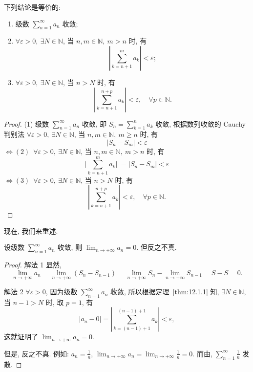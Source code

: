 \begin{theorem}\label{thm:12.1.1}
下列结论是等价的:
\begin{enumerate}
  \item 级数 $\sum_{n=1}^{\infty}a_{n}$ 收敛;
  \item $\forall\varepsilon>0,\ \exists N\in\mathbb{N}$, 当 $n,m\in\mathbb{N},\ m>n$ 时, 有
  \[
    \left|\sum_{k=n+1}^{m}a_{k}\right|<\varepsilon;
\]
  \item $\forall\varepsilon>0,\ \exists N\in\mathbb{N}$, 当 $n>N$ 时, 有
  \[
    \left|\sum_{k=n+1}^{n+p}a_{k}\right|<\varepsilon,\quad \forall p\in\mathbb{N}.
\]
\end{enumerate}
\end{theorem}

\begin{proof}
(1) 级数 $\sum_{n=1}^{\infty}a_{n}$ 收敛, 即 $S_{n}=\sum_{k=1}^{n}a_{k}$ 收敛, 根据数列收敛的 Cauchy 判别法 $\forall\varepsilon>0,\ \exists N\in\mathbb{N}$, 当 $n,m\in\mathbb{N},\ m\geqslant n$ 时, 有
\[
  |S_{n}-S_{m}|<\varepsilon
\]
$\Leftrightarrow(2)$\ $\forall\varepsilon>0,\ \exists N\in\mathbb{N}$, 当 $n,m\in\mathbb{N},\ m>n$ 时, 有
\[
  \Big|\sum_{k=n+1}^{m}a_{k}\Big|\;=|S_{n}-S_{m}|<\varepsilon
\]
$\Leftrightarrow(3)$\ $\forall\varepsilon>0,\ \exists N\in\mathbb{N}$, 当 $n>N$ 时, 有
\[
  \left|\sum_{k=n+1}^{n+p}a_{k}\right|<\varepsilon,\quad \forall p\in\mathbb{N}.
\]
\end{proof}

现在, 我们来重述.

\begin{theorem}[级数收敛的必要条件]\label{thm:12.1.2}
设级数 $\sum_{n=1}^{\infty}a_{n}$ 收敛, 则 $\lim_{n\to+\infty}a_{n}=0$. 但反之不真.
\end{theorem}

\begin{proof}
解法 1 显然,
\[
  \lim_{n\to+\infty}a_{n}=\lim_{n\to+\infty}(S_{n}-S_{n-1})=\lim_{n\to+\infty}S_{n}-\lim_{n\to+\infty}S_{n-1}=S-S=0.
\]

解法 2 $\forall\varepsilon>0$, 因为级数 $\sum_{n=1}^{\infty}a_{n}$ 收敛, 所以根据定理~\ref{thm:12.1.1} 知, $\exists N\in\mathbb{N}$, 当 $n-1>N$ 时, 取 $p=1$, 有
\[
  |a_{n}-0|=\left|\sum_{k=(n-1)+1}^{(n-1)+1}a_{k}\right|<\varepsilon,
\]
这就证明了 $\lim_{n\to+\infty}a_{n}=0$.

但是, 反之不真. 例如: $a_{n}=\frac{1}{n}$, $\lim_{n\to+\infty}a_{n}=\lim_{n\to+\infty}\frac{1}{n}=0$. 而由, $\sum_{n=1}^{\infty}\frac{1}{n}$ 发散.
\end{proof}

